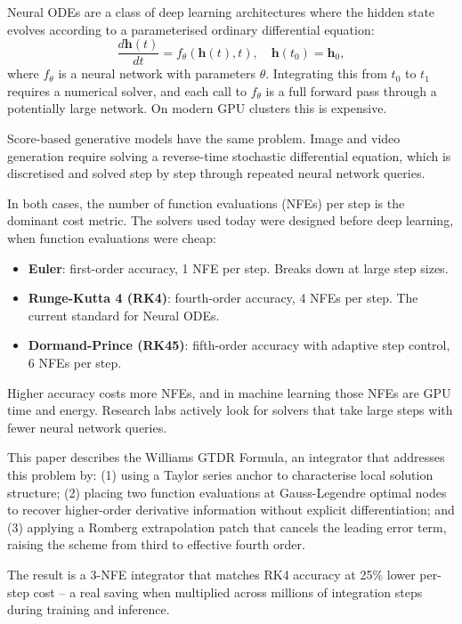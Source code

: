 \documentclass[conference]{IEEEtran}
\begin{document}
Neural ODEs \cite{chen2018neuralode} are a class of deep learning
architectures where the hidden state evolves according to a
parameterised ordinary differential equation:
%
\begin{equation}
    \frac{d\mathbf{h}(t)}{dt} = f_\theta(\mathbf{h}(t), t),
    \quad \mathbf{h}(t_0) = \mathbf{h}_0,
\end{equation}
%
where $f_\theta$ is a neural network with parameters $\theta$.
Integrating this from $t_0$ to $t_1$ requires a numerical solver, and
each call to $f_\theta$ is a full forward pass through a potentially
large network. On modern GPU clusters this is expensive.

Score-based generative models \cite{song2020score} have the same problem.
Image and video generation require solving a reverse-time stochastic
differential equation, which is discretised and solved step by step
through repeated neural network queries.

In both cases, the number of function evaluations (NFEs) per step is the
dominant cost metric. The solvers used today were designed before deep
learning, when function evaluations were cheap:
%
\begin{itemize}
    \item \textbf{Euler}: first-order accuracy, 1 NFE per step.
          Breaks down at large step sizes.
    \item \textbf{Runge-Kutta 4 (RK4)}: fourth-order accuracy, 4 NFEs
          per step. The current standard for Neural ODEs.
    \item \textbf{Dormand-Prince (RK45)}: fifth-order accuracy with
          adaptive step control, 6 NFEs per step.
\end{itemize}

Higher accuracy costs more NFEs, and in machine learning those NFEs are
GPU time and energy. Research labs actively look for solvers that take
large steps with fewer neural network queries.

This paper describes the Williams GTDR Formula, an integrator that
addresses this problem by: (1) using a Taylor series anchor to
characterise local solution structure; (2) placing two function
evaluations at Gauss-Legendre optimal nodes to recover higher-order
derivative information without explicit differentiation; and (3) applying
a Romberg extrapolation patch that cancels the leading error term, raising
the scheme from third to effective fourth order.

The result is a 3-NFE integrator that matches RK4 accuracy at 25\% lower
per-step cost -- a real saving when multiplied across millions of
integration steps during training and inference.
\end{document}
